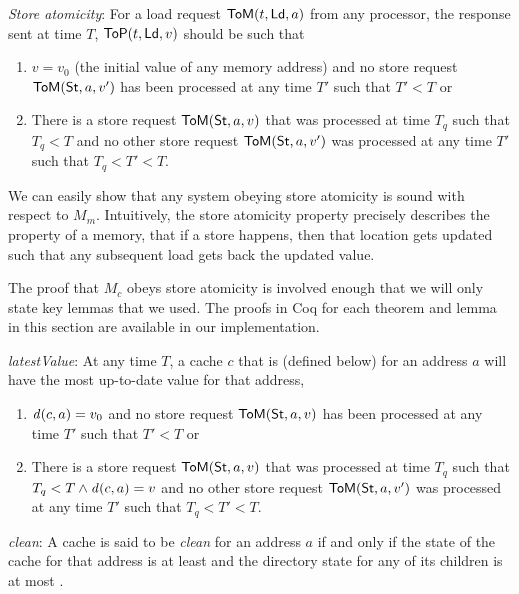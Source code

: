 \begin{defn}
\textit{Store atomicity}:
For a load request $\mathsf{ToM}(t, \mathsf{Ld}, a)$
from any processor, the response sent at time $T$,
$\mathsf{ToP}(t, \mathsf{Ld}, v)$ should be such that
\begin{enumerate}
\item $v = v_0$ (the initial value of any memory address) and no store
  request $\mathsf{ToM}(\mathsf{St}, a, v')$ has been processed at any time $T'$ such
  that $T' < T$ or
\item There is a store request $\mathsf{ToM}(\mathsf{St}, a, v)$ that was processed at time $T_q$ such that
$T_q < T$ and no other store
request $\mathsf{ToM}(\mathsf{St}, a, v')$ was processed at any time $T'$ such that $T_q < T' < T$.
\end{enumerate}
\label{sa}
\end{defn}

We can easily show that any system obeying store atomicity is sound with
respect to $M_m$. Intuitively, the store atomicity property precisely describes
the property of a memory, \viz{} that if a store happens, then that location
gets updated such that any subsequent load gets back the updated value.

The proof that $M_c$ obeys store atomicity is involved enough that we will only
state key lemmas that we used. The proofs in Coq for each theorem and
lemma in this section are available in our implementation.

\begin{lemma}
\textit{latestValue}:
At any time $T$, a cache $c$ that is \clean{} (defined below) for an address
$a$ will have the most up-to-date value for that address, \ie{}
\begin{enumerate}
\item $\mathit{d}(c,a) = v_0$ and no store request $\mathsf{ToM}(\mathsf{St}, a, v)$ has been processed at
any time $T'$ such that $T' < T$ or
\item There is a store request $\mathsf{ToM}(\mathsf{St}, a, v)$ that was processed at time $T_q$ such that
$T_q < T \wedge \mathit{d}(c,a) = v$ and no other store
request $\mathsf{ToM}(\mathsf{St}, a, v')$ was processed at any time $T'$ such that $T_q < T' < T$.
\end{enumerate}
\label{latestValue}
\end{lemma}

\vspace{-.15in}

\begin{defn}
\textit{clean}: A cache is said to be \textit{clean} for an address $a$ if and only if
the state of the cache for that address is at least \Sh{} and the directory 
state for any of its children is at most \Sh.
\label{clean}
\end{defn}

